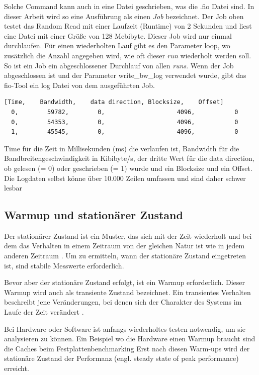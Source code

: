 Solche Command kann auch in eine Datei geschrieben, was die .fio Datei sind. In dieser Arbeit wird so eine Ausführung als einen \textit{Job} bezeichnet.
Der Job oben testet das Random Read mit einer Laufzeit (Runtime) von 2 Sekunden und liest eine Datei mit einer Größe von 128 Mebibyte. Dieser Job wird nur einmal durchlaufen. 
Für einen wiederholten Lauf gibt es den Parameter loop, wo zusätzlich die Anzahl angegeben wird, wie oft dieser \textit{run} wiederholt werden soll.
So ist ein Job ein abgeschlossener Durchlauf von allen \textit{runs}.
Wenn der Job abgeschlossen ist und der Parameter write\_bw\_log verwendet wurde, gibt das fio-Tool ein log Datei von dem ausgeführten Job.

\begin{lstlisting}[caption=Erste Zeilen des Logs (Bezeichnungen sind nicht im Log enthalten),label={lst:log_line_example}]
  [Time,	Bandwidth,    data direction, Blocksize,	Offset]
  0, 	    59782,        0,		            4096,		    0
  0, 	    54353,        0,		            4096,		    0
  1, 	    45545,        0,		            4096,		    0
\end{lstlisting}

Time für die Zeit in Millisekunden (ms) die verlaufen ist, Bandwidth für die
Bandbreitengeschwindigkeit in Kibibyte/s, der dritte Wert für die data direction,
 ob gelesen (= 0) oder geschrieben (= 1) wurde und ein Blocksize und
ein Offset. Die Logdaten selbst könne über 10.000 Zeilen umfassen und sind
daher schwer lesbar

\subsection{Warmup und stationärer Zustand}
Der stationärer Zustand ist ein Muster, das sich mit der Zeit wiederholt und bei dem das Verhalten in einem Zeitraum von der 
gleichen Natur ist wie in jedem anderen Zeitraum \cite{transient_state_definition}. Um zu ermitteln,
wann der stationäre Zustand eingetreten ist, sind stabile Messwerte erforderlich.

Bevor aber der stationäre Zustand erfolgt, ist ein Warmup erforderlich.
Dieser Warmup wird auch als transiente Zustand bezeichnet.
Ein transientes Verhalten beschreibt jene Veränderungen, bei denen sich der Charakter des Systems im Laufe der Zeit verändert \cite{transient_state_definition}.

Bei Hardware oder Software ist anfangs wiederholtes testen notwendig, um
sie analysieren zu können. 
Ein Beispiel wo die Hardware einen Warmup braucht sind die Caches beim Festplattenbenchmarking \cite{nine-year-of-bench}
Erst nach diesen Warm-ups wird der
stationäre Zustand der Performanz (engl. steady state of peak performance)
erreicht.

